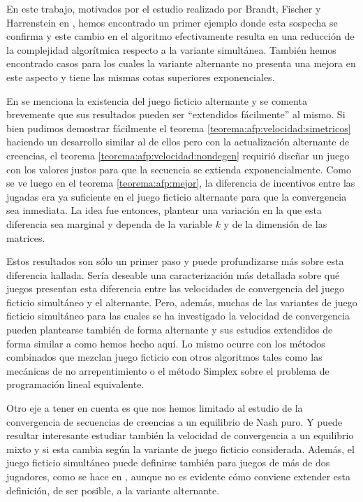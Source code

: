 En este trabajo, motivados por el estudio realizado por Brandt, Fischer y Harrenstein en \cite{brandt:rate:convergence}, hemos encontrado un primer ejemplo donde esta sospecha se confirma y este cambio en el algoritmo efectivamente resulta en una reducción de la complejidad algorítmica respecto a la variante simultánea. También hemos encontrado casos para los cuales la variante alternante no presenta una mejora en este aspecto y tiene las mismas cotas superiores exponenciales.

En \cite{brandt:rate:convergence} se menciona la existencia del juego ficticio alternante y se comenta brevemente que sus resultados pueden ser “extendidos fácilmente” al mismo. Si bien pudimos demostrar fácilmente el teorema \ref{teorema:afp:velocidad:simetricos} haciendo un desarrollo similar al de ellos pero con la actualización alternante de creencias, el teorema \ref{teorema:afp:velocidad:nondegen} requirió diseñar un juego con los valores justos para que la secuencia se extienda exponencialmente. Como se ve luego en el teorema \ref{teorema:afp:mejor}, la diferencia de incentivos entre las jugadas era ya suficiente en el juego ficticio alternante para que la convergencia sea inmediata. La idea fue entonces, plantear una variación en la que esta diferencia sea marginal y dependa de la variable $k$ y de la dimensión de las matrices.

Estos resultados son sólo un primer paso y puede profundizarse más sobre esta diferencia hallada. Sería deseable una caracterización más detallada sobre qué juegos presentan esta diferencia entre las velocidades de convergencia del juego ficticio simultáneo y el alternante. Pero, además, muchas de las variantes de juego ficticio simultáneo para las cuales se ha investigado la velocidad de convergencia pueden plantearse también de forma alternante y sus estudios extendidos de forma similar a como hemos hecho aquí. Lo mismo ocurre con los métodos combinados que mezclan juego ficticio con otros algoritmos tales como las mecánicas de no arrepentimiento o el método Simplex sobre el problema de programación lineal equivalente.

Otro eje a tener en cuenta es que nos hemos limitado al estudio de la convergencia de secuencias de creencias a un equilibrio de Nash puro. Y puede resultar interesante estudiar también la velocidad de convergencia a un equilibrio mixto y si esta cambia según la variante de juego ficticio considerada. Además, el juego ficticio simultáneo puede definirse también para juegos de más de dos jugadores, como se hace en \cite{no:cycling}, aunque no es evidente cómo conviene extender esta definición, de ser posible, a la variante alternante. 